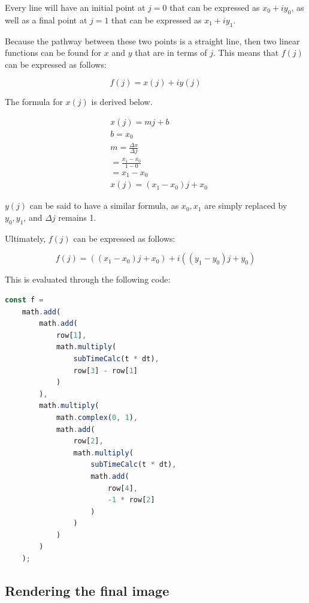 \documentclass[letterpaper, 12pt]{article}
\begin{document}
Every line will have an initial point at \(j=0\) that can be
expressed as \(x_0 + iy_0\), as well as a final point at \(j=1\)
that can be expressed as \(x_1 + iy_1\).

Because the pathway between these two points is a straight line,
then two linear functions can be found for \(x\) and \(y\) that
are in terms of \(j\). This means that \(f(j)\) can be expressed
as follows:

\begin{equation*}
    f(j) = x(j) + iy(j)
\end{equation*}

The formula for \(x(j)\) is derived below.

\begin{align*}
     & x(j) = mj + b
    \\
     & b = x_0
    \\
     & m = \frac{\Delta x}{\Delta j}
    \\
     & = \frac{x_1 - x_0}{1 - 0}
    \\
     & = x_1 - x_0
    \\
     & x(j) = (x_1 - x_0)j + x_0
\end{align*}

\(y(j)\) can be said to have a similar formula, as \(x_0, x_1\) are
simply replaced by \(y_0, y_1\), and \(\Delta j\) remains 1.

Ultimately, \(f(j)\) can be expressed as follows:

\begin{equation}
    f(j) = ((x_1 - x_0)j + x_0) + i((y_1 - y_0)j + y_0)
\end{equation}

This is evaluated through the following code:
\begin{lstlisting}[language=JavaScript]
    const f =
    math.add(
        math.add(
            row[1],
            math.multiply(
                subTimeCalc(t * dt),
                row[3] - row[1]
            )
        ),
        math.multiply(
            math.complex(0, 1),
            math.add(
                row[2],
                math.multiply(
                    subTimeCalc(t * dt),
                    math.add(
                        row[4],
                        -1 * row[2]
                    )
                )
            )
        )
    );
\end{lstlisting}

\subsection{Rendering the final image}
\end{document}
